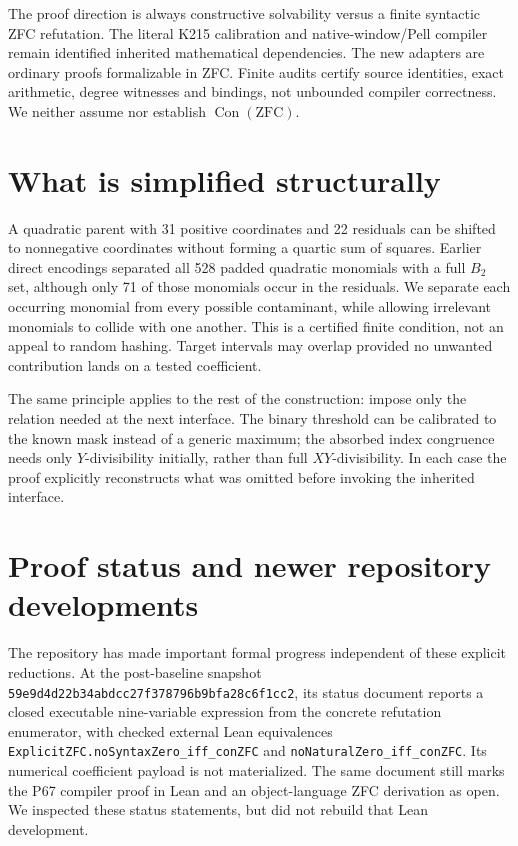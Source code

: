 \documentclass[11pt]{article}
\newcommand{\Con}{\operatorname{Con}}
\begin{document}
The proof direction is always constructive solvability versus a finite
syntactic ZFC refutation. The literal K215 calibration and native-window/Pell
compiler remain identified inherited mathematical dependencies. The new
adapters are ordinary proofs formalizable in ZFC. Finite audits certify
source identities, exact arithmetic, degree witnesses and bindings, not
unbounded compiler correctness. We neither assume nor establish
$\Con(\mathrm{ZFC})$.



\section{What is simplified structurally}
A quadratic parent with 31 positive coordinates and 22 residuals can be
shifted to nonnegative coordinates without forming a quartic sum of
squares. Earlier direct encodings separated all 528 padded quadratic
monomials with a full $B_2$ set, although only 71 of those monomials occur
in the residuals. We separate each occurring monomial from every possible
contaminant, while allowing irrelevant monomials to collide with one
another. This is a certified finite condition, not an appeal to random
hashing. Target intervals may overlap provided no unwanted contribution
lands on a tested coefficient.

The same principle applies to the rest of the construction: impose only
the relation needed at the next interface. The binary threshold can be
calibrated to the known mask instead of a generic maximum; the absorbed
index congruence needs only $Y$-divisibility initially, rather than full
$XY$-divisibility. In each case the proof explicitly reconstructs what was
omitted before invoking the inherited interface.








\section{Proof status and newer repository developments}
The repository has made important formal progress independent of these
explicit reductions. At the post-baseline snapshot
\texttt{59e9d4d22b34abdcc27f378796b9bfa28c6f1cc2}, its status document
reports a closed executable nine-variable expression from the concrete
refutation enumerator, with checked external Lean equivalences
\texttt{ExplicitZFC.noSyntaxZero\_iff\_conZFC} and
\texttt{noNaturalZero\_iff\_conZFC}. Its numerical coefficient payload
is not materialized. The same document still marks the P67 compiler proof
in Lean and an object-language ZFC derivation as open. We inspected these
status statements, but did not rebuild that Lean development.
\end{document}
